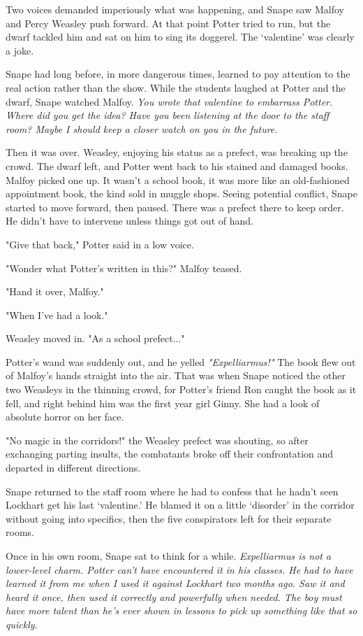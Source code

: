 \documentclass[a4paper,11pt]{article}
\begin{document}
Two voices demanded imperiously what was happening, and Snape saw Malfoy and Percy Weasley push forward. At that point Potter tried to run, but the dwarf tackled him and sat on him to sing its doggerel. The `valentine' was clearly a joke.

Snape had long before, in more dangerous times, learned to pay attention to the real action rather than the show. While the students laughed at Potter and the dwarf, Snape watched Malfoy. \emph{You wrote that valentine to embarrass Potter. Where did you get the idea? Have you been listening at the door to the staff room? Maybe I should keep a closer watch on you in the future.}

Then it was over. Weasley, enjoying his status as a prefect, was breaking up the crowd. The dwarf left, and Potter went back to his stained and damaged books. Malfoy picked one up. It wasn't a school book, it was more like an old-fashioned appointment book, the kind sold in muggle shops. Seeing potential conflict, Snape started to move forward, then paused. There was a prefect there to keep order. He didn't have to intervene unless things got out of hand.

"Give that back," Potter said in a low voice.

"Wonder what Potter's written in this?" Malfoy teased.

"Hand it over, Malfoy."

"When I've had a look."

Weasley moved in. "As a school prefect..."

Potter's wand was suddenly out, and he yelled \emph{"Expelliarmus!"} The book flew out of Malfoy's hands straight into the air. That was when Snape noticed the other two Weasleys in the thinning crowd, for Potter's friend Ron caught the book as it fell, and right behind him was the first year girl Ginny. She had a look of absolute horror on her face.

"No magic in the corridors!" the Weasley prefect was shouting, so after exchanging parting insults, the combatants broke off their confrontation and departed in different directions.

Snape returned to the staff room where he had to confess that he hadn't seen Lockhart get his last `valentine.' He blamed it on a little `disorder' in the corridor without going into specifics, then the five conspirators left for their separate rooms.

Once in his own room, Snape sat to think for a while. \emph{Expelliarmus is not a lower-level charm. Potter can't have encountered it in his classes. He had to have learned it from me when I used it against Lockhart two months ago. Saw it and heard it once, then used it correctly and powerfully when needed. The boy must have more talent than he's ever shown in lessons to pick up something like that so quickly.}
\end{document}
